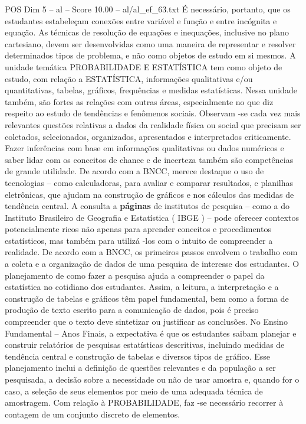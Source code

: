 \begin{textsample}{POS Dim 5 – al – Score 10.00 – al/al\_ef\_63.txt}
É necessário, portanto, que os estudantes estabeleçam conexões entre variável e função e entre incógnita e equação.
As técnicas de resolução de equações e inequações, inclusive no plano cartesiano, devem ser desenvolvidas como uma maneira de representar e resolver determinados tipos de problema, e não como objetos de estudo em si mesmos.
A unidade temática PROBABILIDADE E ESTATÍSTICA tem como objeto de estudo, com relação a ESTATÍSTICA, informações qualitativas e/ou quantitativas, tabelas, gráficos, frequências e medidas estatísticas.
Nessa unidade também, são fortes as relações com outras áreas, especialmente no que diz respeito ao estudo de tendências e fenômenos sociais.
Observam -se cada vez mais relevantes questões relativas a dados da realidade física ou social que precisam ser coletados, selecionados, organizados, apresentados e interpretados criticamente.
Fazer inferências com base em informações qualitativas ou dados numéricos e saber lidar com os conceitos de chance e de incerteza também são competências de grande utilidade.
De acordo com a BNCC, merece destaque o uso de tecnologias – como calculadoras, para avaliar e comparar resultados, e planilhas eletrônicas, que ajudam na construção de gráficos e nos cálculos das medidas de tendência central.
A consulta a \textbf{páginas} de institutos de pesquisa – como a do Instituto Brasileiro de Geografia e Estatística ( IBGE ) – pode oferecer contextos potencialmente ricos não apenas para aprender conceitos e procedimentos estatísticos, mas também para utilizá -los com o intuito de compreender a realidade.
De acordo com a BNCC, os primeiros passos envolvem o trabalho com a coleta e a organização de dados de uma pesquisa de interesse dos estudantes.
O planejamento de como fazer a pesquisa ajuda a compreender o papel da estatística no cotidiano dos estudantes.
Assim, a leitura, a interpretação e a construção de tabelas e gráficos têm papel fundamental, bem como a forma de produção de texto escrito para a comunicação de dados, pois é preciso compreender que o texto deve sintetizar ou justificar as conclusões.
No Ensino Fundamental – Anos Finais, a expectativa é que os estudantes saibam planejar e construir relatórios de pesquisas estatísticas descritivas, incluindo medidas de tendência central e construção de tabelas e diversos tipos de gráfico.
Esse planejamento inclui a definição de questões relevantes e da população a ser pesquisada, a decisão sobre a necessidade ou não de usar amostra e, quando for o caso, a seleção de seus elementos por meio de uma adequada técnica de amostragem.
Com relação à PROBABILIDADE, faz -se necessário recorrer à contagem de um conjunto discreto de elementos.

\end{textsample}
